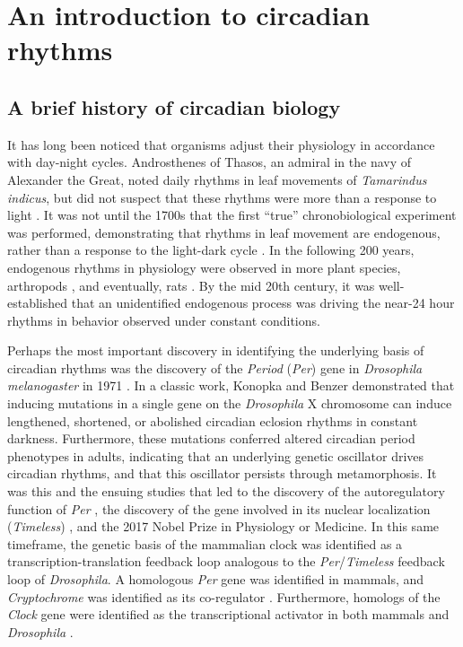 \section{An introduction to circadian rhythms}

\subsection*{A brief history of circadian biology}
It has long been noticed that organisms adjust their physiology in accordance with day-night cycles.
Androsthenes of Thasos, an admiral in the navy of Alexander the Great, noted daily rhythms in leaf movements of \textit{Tamarindus indicus}, but did not suspect that these rhythms were more than a response to light \cite{McClung2006b}.
It was not until the 1700s that the first ``true'' chronobiological experiment was performed, demonstrating that rhythms in leaf movement are endogenous, rather than a response to the light-dark cycle \cite{de1729observation}.
In the following 200 years, endogenous rhythms in physiology were observed in more plant species, arthropods \cite{kiesel1894untersuchungen}, and eventually, rats \cite{richter1922behavioristic}.
By the mid 20th century, it was well-established that an unidentified endogenous process was driving the near-24 hour rhythms in behavior observed under constant conditions.

Perhaps the most important discovery in identifying the underlying basis of circadian rhythms was the discovery of the \textit{Period} (\textit{Per}) gene in \textit{Drosophila melanogaster} in 1971 \cite{Konopka1971}.
In a classic work, Konopka and Benzer demonstrated that inducing mutations in a single gene on the \textit{Drosophila} X chromosome can induce lengthened, shortened, or abolished circadian eclosion rhythms in constant darkness.
Furthermore, these mutations conferred altered circadian period phenotypes in adults, indicating that an underlying genetic oscillator drives circadian rhythms, and that this oscillator persists through metamorphosis.
It was this and the ensuing studies that led to the discovery of the autoregulatory function of \textit{Per} \cite{Hardin1990}, the discovery of the gene involved in its nuclear localization (\textit{Timeless}) \cite{Vosshall1994}, and the 2017 Nobel Prize in Physiology or Medicine.
In this same timeframe, the genetic basis of the mammalian clock was identified as a transcription-translation feedback loop analogous to the \textit{Per}/\textit{Timeless} feedback loop of \textit{Drosophila}.
A homologous \textit{Per} gene was identified in mammals, and \textit{Cryptochrome} was identified as its co-regulator \cite{Vitaterna1999}.
Furthermore, homologs of the \textit{Clock} gene were identified as the transcriptional activator in both mammals and \textit{Drosophila} \cite{Vitaterna1994, Darlington1998}.

